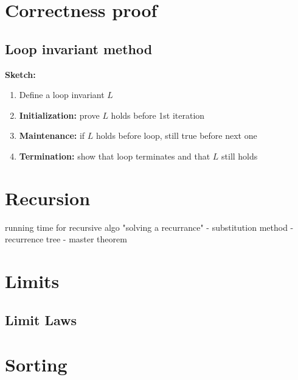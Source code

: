 \documentclass{article}
\begin{document}
\section{Correctness proof}
\subsection{Loop invariant method}
\textbf{Sketch: }
\begin{enumerate}
    \item Define a loop invariant $L$
    \item \textbf{Initialization: }prove $L$ holds before 1st iteration
    \item \textbf{Maintenance: }if $L$ holds before loop, still true before next one
    \item \textbf{Termination: }show that loop terminates and that $L$ still holds
\end{enumerate}





\section{Recursion}
running time for recursive algo
"solving a recurrance"
- substitution method
- recurrence tree
- master theorem
\section{Limits}
\subsection{Limit Laws}


\section{Sorting}
\end{document}
